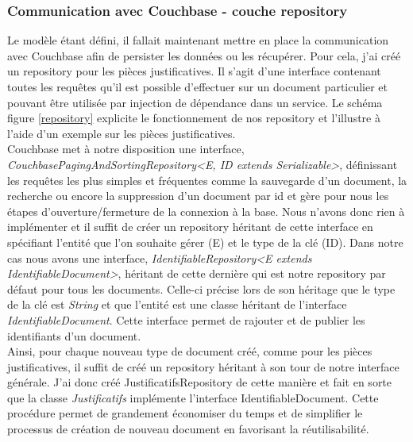 	
	\subsubsection{Communication avec Couchbase - couche repository}
	
	Le modèle étant défini, il fallait maintenant mettre en place la communication avec Couchbase afin de persister les données ou les récupérer. Pour cela, j'ai créé un repository pour les pièces justificatives. Il s'agit d'une interface contenant toutes les requêtes qu'il est possible d'effectuer sur un document particulier et pouvant être utilisée par injection de dépendance dans un service. Le schéma figure \ref{repository} explicite le fonctionnement de nos repository et l'illustre à l'aide d'un exemple sur les pièces justificatives. \\
	
	Couchbase met à notre disposition une interface, \textit{CouchbasePagingAndSortingRepository<E, ID extends Serializable>}, définissant les requêtes les plus simples et fréquentes comme la sauvegarde d'un document, la recherche ou encore la suppression d'un document par id et gère pour nous les étapes d'ouverture/fermeture de la connexion à la base. Nous n'avons donc rien à implémenter et il suffit de créer un repository héritant de cette interface en spécifiant l'entité que l'on souhaite gérer (E) et le type de la clé (ID). Dans notre cas nous avons une interface, \textit{IdentifiableRepository<E extends IdentifiableDocument>}, héritant de cette dernière qui est notre repository par défaut pour tous les documents. Celle-ci précise lors de son héritage que le type de la clé est \textit{String } et que l'entité est une classe héritant de l'interface \textit{IdentifiableDocument}. Cette interface permet de rajouter et de publier les identifiants d'un document. \\
	
	Ainsi, pour chaque nouveau type de document créé, comme pour les pièces justificatives, il suffit de créé un repository héritant à son tour de notre interface générale. J'ai donc créé JustificatifsRepository de cette manière et fait en sorte que la classe \textit{Justificatifs} implémente l'interface IdentifiableDocument. Cette procédure permet de grandement économiser du temps et de simplifier le processus de création de nouveau document en favorisant la réutilisabilité.

